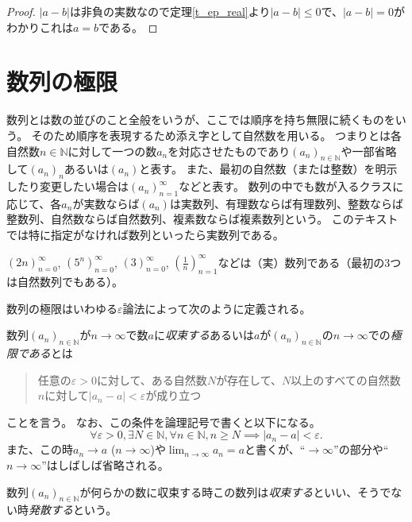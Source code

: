 \begin{proof}
$|a-b|$は非負の実数なので定理\ref{t_ep_real}より$|a-b| \le 0$で、$|a-b| = 0$がわかりこれは$a = b$である。
\end{proof}

\section{数列の極限}

数列とは数の並びのこと全般をいうが、ここでは順序を持ち無限に続くものをいう。
そのため順序を表現するため添え字として自然数を用いる。
つまり\emph{}とは各自然数$n \in \mathbb{N}$に対して一つの数$a_n$を対応させたものであり$(a_n)_{n \in \mathbb{N}}$や一部省略して$(a_n)_n$あるいは$(a_n)$と表す。
また、最初の自然数（または整数）を明示したり変更したい場合は$(a_n)_{n = 1}^\infty$などと表す。
数列の中でも数が入るクラスに応じて、各$a_n$が実数ならば$(a_n)$は実数列、有理数ならば有理数列、整数ならば整数列、自然数ならば自然数列、複素数ならば複素数列という。
このテキストでは特に指定がなければ数列といったら実数列である。

\begin{example}
$(2 n)_{n = 0}^\infty$, $(5^n)_{n = 0}^\infty$, $(3)_{n = 0}^\infty$, $(\frac{1}{n})_{n = 1}^\infty$などは（実）数列である（最初の3つは自然数列でもある）。
\end{example}

数列の極限はいわゆる$\varepsilon$論法によって次のように定義される。

\begin{definition}[数列の極限]
数列$(a_n)_{n \in \mathbb{N}}$が$n \to \infty$で数$a$に\emph{収束する}あるいは$a$が$(a_n)_{n \in \mathbb{N}}$の$n \to \infty$での\emph{極限である}とは
\begin{quote}
任意の$\varepsilon > 0$に対して、ある自然数$N$が存在して、$N$以上のすべての自然数$n$に対して$|a_n-a| < \varepsilon$が成り立つ
\end{quote}
ことを言う。
なお、この条件を論理記号で書くと以下になる。
$$
\forall \varepsilon > 0, \exists N \in \mathbb{N}, \forall n \in \mathbb{N}, n \ge N \implies |a_n-a| < \varepsilon.
$$
また、この時$a_n \to a$ ($n \to \infty$)や$\lim_{n \to \infty}a_n = a$と書くが、``$\to \infty$''の部分や``$n \to \infty$''はしばしば省略される。

数列$(a_n)_{n \in \mathbb{N}}$が何らかの数に収束する時この数列は\emph{収束する}といい、そうでない時\emph{発散する}という。
\end{definition}

